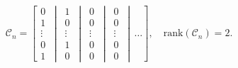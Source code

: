 \begin{equation}
\mathcal{C}_n=\left[ \begin{matrix} 
0\\
1\\
\vdots\\
0\\
1
\end{matrix}
\,\middle\vert\,
  \begin{matrix} 
1\\
0\\
\vdots\\
1\\
0
\end{matrix}
\,\middle\vert\,
\begin{matrix} 
0\\
0\\
\vdots\\
0\\
0
\end{matrix}
\,\middle\vert\,
\begin{matrix} 
0\\
0\\
\vdots\\
0\\
0
\end{matrix}\,\middle\vert\,
\ldots \right], \quad \textrm{rank}(\mathcal{C}_n)=2.
\end{equation}  
